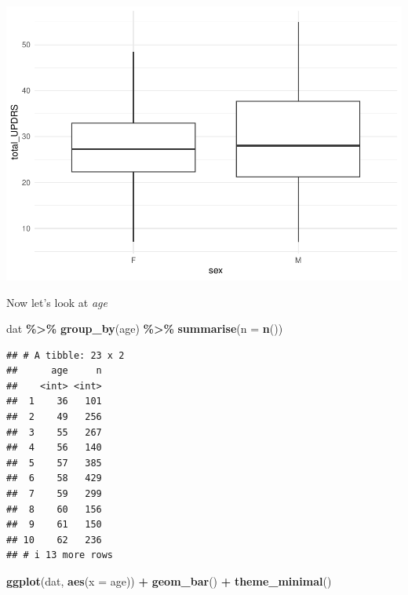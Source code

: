 \documentclass[
]{article}
\newenvironment{Shaded}{\begin{snugshade}}{\end{snugshade}}
\newcommand{\AttributeTok}[1]{\textcolor[rgb]{0.13,0.29,0.53}{#1}}
\newcommand{\FunctionTok}[1]{\textcolor[rgb]{0.13,0.29,0.53}{\textbf{#1}}}
\newcommand{\NormalTok}[1]{#1}
\newcommand{\SpecialCharTok}[1]{\textcolor[rgb]{0.81,0.36,0.00}{\textbf{#1}}}
\begin{document}
\includegraphics{Data_Exploration_files/figure-latex/unnamed-chunk-10-1.pdf}

Now let's look at \emph{age}

\begin{Shaded}
\begin{Highlighting}[]
\NormalTok{dat }\SpecialCharTok{\%\textgreater{}\%} \FunctionTok{group\_by}\NormalTok{(age) }\SpecialCharTok{\%\textgreater{}\%} \FunctionTok{summarise}\NormalTok{(}\AttributeTok{n =} \FunctionTok{n}\NormalTok{())}
\end{Highlighting}
\end{Shaded}

\begin{verbatim}
## # A tibble: 23 x 2
##      age     n
##    <int> <int>
##  1    36   101
##  2    49   256
##  3    55   267
##  4    56   140
##  5    57   385
##  6    58   429
##  7    59   299
##  8    60   156
##  9    61   150
## 10    62   236
## # i 13 more rows
\end{verbatim}

\begin{Shaded}
\begin{Highlighting}[]
\FunctionTok{ggplot}\NormalTok{(dat, }\FunctionTok{aes}\NormalTok{(}\AttributeTok{x =}\NormalTok{ age)) }\SpecialCharTok{+}
  \FunctionTok{geom\_bar}\NormalTok{() }\SpecialCharTok{+} 
  \FunctionTok{theme\_minimal}\NormalTok{()}
\end{Highlighting}
\end{Shaded}
\end{document}
